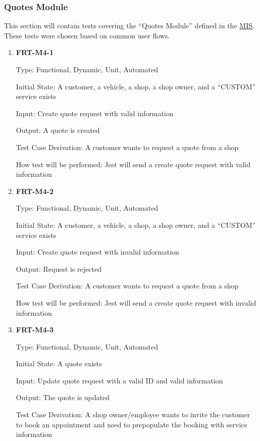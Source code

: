 \documentclass[12pt, titlepage]{article}
\begin{document}
\subsubsection{Quotes Module}

This section will contain tests covering the ``Quotes Module'' defined in the
\href{https://github.com/arkinmodi/project-sayyara/blob/main/docs/Design/MIS/MIS.pdf}{MIS}. These
tests were chosen based on common user flows.

\begin{enumerate}

	\item \textbf{FRT-M4-1}

	      Type: Functional, Dynamic, Unit, Automated

	      Initial State: A customer, a vehicle, a shop, a shop owner, and a ``CUSTOM'' service exists

	      Input: Create quote request with valid information

	      Output: A quote is created

	      Test Case Derivation: A customer wants to request a quote from a shop

	      How test will be performed: Jest will send a create quote request with valid information

	\item \textbf{FRT-M4-2}

	      Type: Functional, Dynamic, Unit, Automated

	      Initial State: A customer, a vehicle, a shop, a shop owner, and a ``CUSTOM'' service exists

	      Input: Create quote request with invalid information

	      Output: Request is rejected

	      Test Case Derivation: A customer wants to request a quote from a shop

	      How test will be performed: Jest will send a create quote request with invalid information

	\item \textbf{FRT-M4-3}

	      Type: Functional, Dynamic, Unit, Automated

	      Initial State: A quote exists

	      Input: Update quote request with a valid ID and valid information

	      Output: The quote is updated

	      Test Case Derivation: A shop owner/employee wants to invite the customer to book an appointment and
	      need to prepopulate the booking with service information


\end{enumerate}
\end{document}
